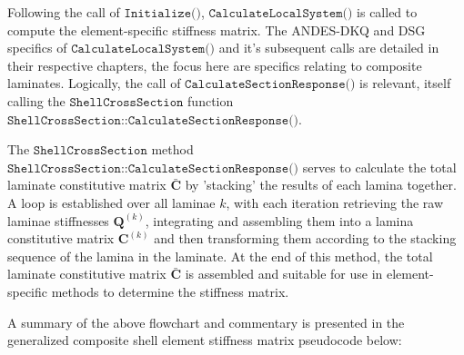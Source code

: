 Following the call of $\texttt{Initialize()}$, $\texttt{CalculateLocalSystem()}$ is called to compute the element-specific stiffness matrix. The ANDES-DKQ and DSG specifics of $\texttt{CalculateLocalSystem()}$ and it's subsequent calls are detailed in their respective chapters, the focus here are specifics relating to composite laminates. Logically, the call of $\texttt{CalculateSectionResponse()}$ is relevant, itself calling the $\texttt{ShellCrossSection}$ function \linebreak$\texttt{ShellCrossSection::CalculateSectionResponse()}$.

The $\texttt{ShellCrossSection}$ method $\texttt{ShellCrossSection::CalculateSectionResponse()}$ serves to calculate the total laminate constitutive matrix $\bar{\mathbf{C}}$ by 'stacking' the results of each lamina together. A loop is established over all laminae $k$, with each iteration retrieving the raw laminae stiffnesses $\mathbf{Q}^{(k)}$, integrating and assembling them into a lamina constitutive matrix $\mathbf{C}^{(k)}$ and then transforming them according to the stacking sequence of the lamina in the laminate. At the end of this method, the total laminate constitutive matrix $\bar{\mathbf{C}}$ is assembled and suitable for use in element-specific methods to determine the stiffness matrix. 

A summary of the above flowchart and commentary is presented in the generalized composite shell element stiffness matrix pseudocode below:

